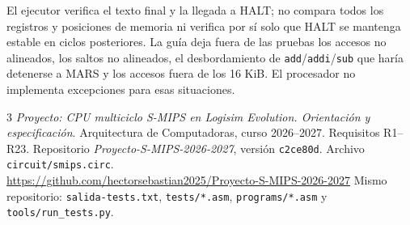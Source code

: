 \documentclass[11pt,a4paper]{article}
\newcommand{\sig}[1]{\texttt{#1}}
\begin{document}
El ejecutor verifica el texto final y la llegada a HALT; no compara todos
los registros y posiciones de memoria ni verifica por sí solo que HALT se
mantenga estable en ciclos posteriores. La guía deja fuera de las pruebas
los accesos no alineados, los saltos no alineados, el desbordamiento de
\sig{add}/\sig{addi}/\sig{sub} que haría detenerse a MARS y los accesos
fuera de los 16 KiB. El procesador no implementa excepciones para esas
situaciones.

\begin{thebibliography}{3}
\small
{} \emph{Proyecto: CPU multiciclo S-MIPS en Logisim Evolution.
Orientación y especificación}. Arquitectura de Computadoras,
curso 2026--2027. Requisitos R1--R23.
 Repositorio \emph{Proyecto-S-MIPS-2026-2027},
versión \sig{c2ce80d}. Archivo \sig{circuit/smips.circ}.\\
\url{https://github.com/hectorsebastian2025/Proyecto-S-MIPS-2026-2027}
 Mismo repositorio: \sig{salida-tests.txt},
\sig{tests/*.asm}, \sig{programs/*.asm} y \sig{tools/run\_tests.py}.
\end{thebibliography}
\end{document}
